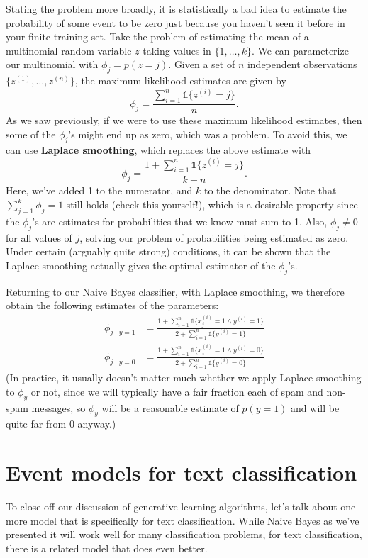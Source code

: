 Stating the problem more broadly, it is statistically a bad idea to estimate
the probability of some event to be zero just because you haven't seen
it before in your finite training set. Take the problem of estimating the mean
of a multinomial random variable $z$ taking values in $\{1,\ldots,k\}$. We can parameterize
our multinomial with $\phi_j = p(z = j)$. Given a set of $n$ independent
observations $\{z^{(1)} ,\ldots,z^{(n)}\}$, the maximum likelihood estimates are given by
\begin{equation}
    \phi_j = \frac{\sum_{i=1}^n \mathbb{1}\{z^{(i)} = j\}}{n}.
\end{equation}
As we saw previously, if we were to use these maximum likelihood estimates,
then some of the $\phi_j$'s might end up as zero, which was a problem. To avoid
this, we can use \textbf{Laplace smoothing}, which replaces the above estimate
with
\begin{equation}
    \phi_j = \frac{1 + \sum_{i=1}^n \mathbb{1}\{z^{(i)} = j\}}{k + n}.
\end{equation}
Here, we've added 1 to the numerator, and $k$ to the denominator. Note that
$\sum_{j=1}^k \phi_j = 1$ still holds (check this yourself!), which is a desirable property
since the $\phi_j$'s are estimates for probabilities that we know must sum to 1.
Also, $\phi_j \ne 0$ for all values of $j$, solving our problem of probabilities being
estimated as zero. Under certain (arguably quite strong) conditions, it can
be shown that the Laplace smoothing actually gives the optimal estimator
of the $\phi_j$'s.

Returning to our Naive Bayes classifier, with Laplace smoothing, we
therefore obtain the following estimates of the parameters:
\begin{align}
    \phi_{j \mid y=1} &= \frac{1 + \sum^n_{i=1} \mathbb{1}\{x^{(i)}_j = 1 \wedge y^{(i)} = 1\}}{2 + \sum^n_{i=1} \mathbb{1}\{y ^{(i)} = 1\}}\\
    \phi_{j \mid y=0} &= \frac{1 + \sum^n_{i=1} \mathbb{1}\{x^{(i)}_j = 1 \wedge y^{(i)} = 0\}}{2 + \sum^n_{i=1} \mathbb{1}\{y ^{(i)} = 0\}}
\end{align}
(In practice, it usually doesn't matter much whether we apply Laplace smoothing
to $\phi_y$ or not, since we will typically have a fair fraction each of spam and
non-spam messages, so $\phi_y$ will be a reasonable estimate of $p(y = 1)$ and will
be quite far from 0 anyway.)

\section{Event models for text classification}
To close off our discussion of generative learning algorithms, let's talk about
one more model that is specifically for text classification. While Naive Bayes
as we've presented it will work well for many classification problems, for text
classification, there is a related model that does even better.

